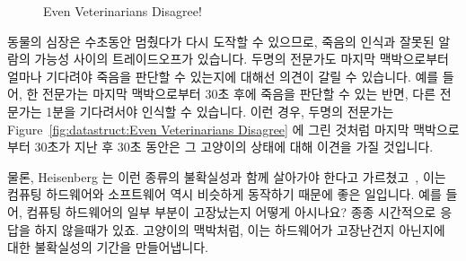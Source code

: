 \begin{figure}[tb]
\centering
{}
\caption{Even Veterinarians Disagree!}
\end{figure}

동물의 심장은 수초동안 멈췄다가 다시 도작할 수 있으므로, 죽음의 인식과 잘못된
알람의 가능성 사이의 트레이드오프가 있습니다.
두명의 전문가도 마지막 맥박으로부터 얼마나 기다려야 죽음을 판단할 수 있는지에
대해선 의견이 갈릴 수 있습니다.
예를 들어, 한 전문가는 마지막 맥박으로부터 30초 후에 죽음을 판단할 수 있는
반면, 다른 전문가는 1분을 기다려서야 인식할 수 있습니다.
이런 경우, 두명의 전문가는
Figure~\ref{fig:datastruct:Even Veterinarians Disagree} 에 그린 것처럼 마지막
맥박으로부터 30초가 지난 후 30초 동안은 그 고양이의 상태에 대해 이견을 가질
것입니다.

물론, Heisenberg 는 이런 종류의 불확실성과 함께 살아가야 한다고
가르쳤고~\cite{WeinerHeisenberg1927Uncertain}, 이는 컴퓨팅 하드웨어와
소프트웨어 역시 비슷하게 동작하기 때문에 좋은 일입니다.
예를 들어, 컴퓨팅 하드웨어의 일부 부분이 고장났는지 어떻게 아시나요?
종종 시간적으로 응답을 하지 않을때가 있죠.
고양이의 맥박처럼, 이는 하드웨어가 고장난건지 아닌지에 대한 불확실성의 기간을
만들어냅니다.
\iffalse

